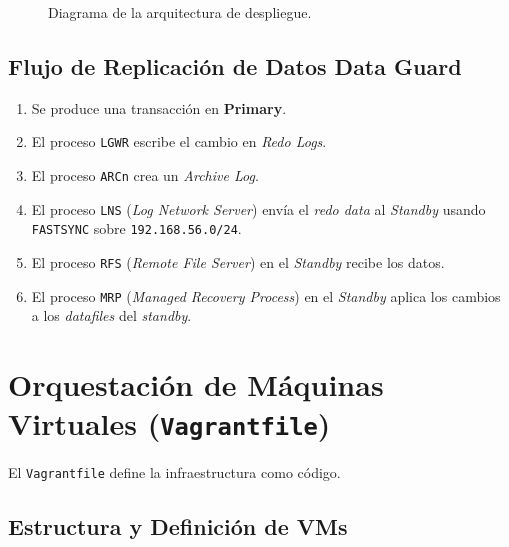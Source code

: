 \documentclass[11pt, a4paper]{report}
\begin{document}
\begin{figure}[htbp]
  \caption{Diagrama de la arquitectura de despliegue.}
  \label{fig:arquitectura_tikz}
\end{figure}

\subsection{Flujo de Replicación de Datos Data Guard}

\begin{enumerate}
    \item Se produce una transacción en \textbf{Primary}.
\item El proceso \texttt{LGWR} escribe el cambio en \textit{Redo Logs}.
    \item El proceso \texttt{ARCn} crea un \textit{Archive Log}.
\item El proceso \texttt{LNS} (\textit{Log Network Server}) envía el \textit{redo data} al \textit{Standby} usando \texttt{FASTSYNC} sobre \texttt{192.168.56.0/24}.
\item El proceso \texttt{RFS} (\textit{Remote File Server}) en el \textit{Standby} recibe los datos.
\item El proceso \texttt{MRP} (\textit{Managed Recovery Process}) en el \textit{Standby} aplica los cambios a los \textit{datafiles} del \textit{standby}.
\end{enumerate}

\section{Orquestación de Máquinas Virtuales (\texttt{Vagrantfile})}

El \texttt{Vagrantfile} define la infraestructura como código.
\subsection{Estructura y Definición de VMs}
\end{document}

